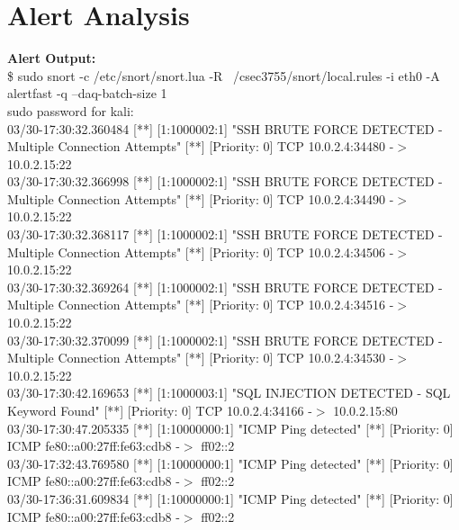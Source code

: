 \documentclass[12pt]{article}
\begin{document}
\section{Alert Analysis}
\textbf{Alert Output:}\\
\$ sudo snort -c /etc/snort/snort.lua -R ~/csec3755/snort/local.rules -i eth0 -A alert\underbar{   }fast -q --daq-batch-size 1 \\                  
sudo password for kali: \\
03/30-17:30:32.360484 [**] [1:1000002:1] "SSH BRUTE FORCE DETECTED - Multiple Connection Attempts" [**] [Priority: 0] {TCP} 10.0.2.4:34480 -$>$ 10.0.2.15:22\\
03/30-17:30:32.366998 [**] [1:1000002:1] "SSH BRUTE FORCE DETECTED - Multiple Connection Attempts" [**] [Priority: 0] {TCP} 10.0.2.4:34490 -$>$ 10.0.2.15:22\\
03/30-17:30:32.368117 [**] [1:1000002:1] "SSH BRUTE FORCE DETECTED - Multiple Connection Attempts" [**] [Priority: 0] {TCP} 10.0.2.4:34506 -$>$ 10.0.2.15:22\\
03/30-17:30:32.369264 [**] [1:1000002:1] "SSH BRUTE FORCE DETECTED - Multiple Connection Attempts" [**] [Priority: 0] {TCP} 10.0.2.4:34516 -$>$ 10.0.2.15:22\\
03/30-17:30:32.370099 [**] [1:1000002:1] "SSH BRUTE FORCE DETECTED - Multiple Connection Attempts" [**] [Priority: 0] {TCP} 10.0.2.4:34530 -$>$ 10.0.2.15:22\\
03/30-17:30:42.169653 [**] [1:1000003:1] "SQL INJECTION DETECTED - SQL Keyword Found" [**] [Priority: 0] {TCP} 10.0.2.4:34166 -$>$ 10.0.2.15:80\\
03/30-17:30:47.205335 [**] [1:10000000:1] "ICMP Ping detected" [**] [Priority: 0] {ICMP} fe80::a00:27ff:fe63:cdb8 -$>$ ff02::2\\
03/30-17:32:43.769580 [**] [1:10000000:1] "ICMP Ping detected" [**] [Priority: 0] {ICMP} fe80::a00:27ff:fe63:cdb8 -$>$ ff02::2\\
03/30-17:36:31.609834 [**] [1:10000000:1] "ICMP Ping detected" [**] [Priority: 0] {ICMP} fe80::a00:27ff:fe63:cdb8 -$>$ ff02::2\\
\end{document}
